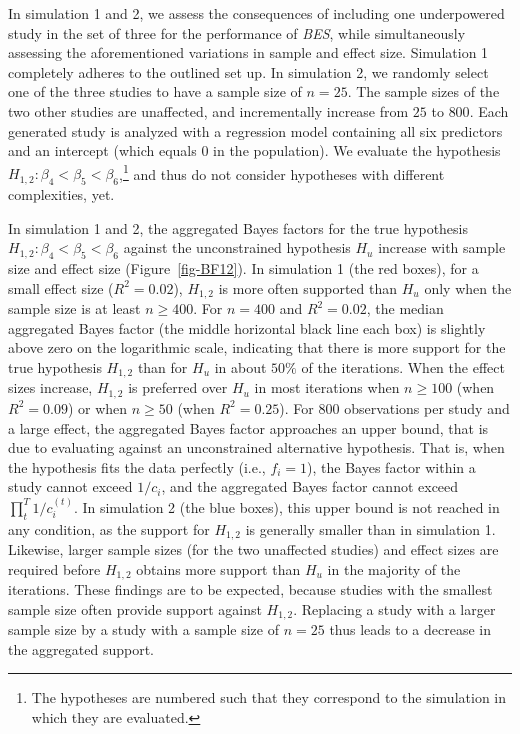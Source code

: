 \documentclass[
]{interact}
\begin{document}
In simulation 1 and 2, we assess the consequences of including one
underpowered study in the set of three for the performance of
\emph{BES}, while simultaneously assessing the aforementioned variations
in sample and effect size. Simulation 1 completely adheres to the
outlined set up. In simulation 2, we randomly select one of the three
studies to have a sample size of \(n = 25\). The sample sizes of the two
other studies are unaffected, and incrementally increase from \(25\) to
\(800\). Each generated study is analyzed with a regression model
containing all six predictors and an intercept (which equals 0 in the
population). We evaluate the hypothesis
\(H_{1,2}: \beta_4 < \beta_5 < \beta_6\),\footnote{ The hypotheses are
  numbered such that they correspond to the simulation in which they are
  evaluated.} and thus do not consider hypotheses with different
complexities, yet.

In simulation 1 and 2, the aggregated Bayes factors for the true
hypothesis \(H_{1,2}: \beta_4 < \beta_5 < \beta_6\) against the
unconstrained hypothesis \(H_u\) increase with sample size and effect
size (Figure~\ref{fig-BF12}). In simulation 1 (the red boxes), for a
small effect size (\(R^2 = 0.02\)), \(H_{1,2}\) is more often supported
than \(H_u\) only when the sample size is at least \(n \geq 400\). For
\(n = 400\) and \(R^2 = 0.02\), the median aggregated Bayes factor (the
middle horizontal black line each box) is slightly above zero on the
logarithmic scale, indicating that there is more support for the true
hypothesis \(H_{1,2}\) than for \(H_u\) in about \(50\%\) of the
iterations. When the effect sizes increase, \(H_{1,2}\) is preferred
over \(H_u\) in most iterations when \(n \geq 100\) (when
\(R^2 = 0.09\)) or when \(n \geq 50\) (when \(R^2 = 0.25\)). For \(800\)
observations per study and a large effect, the aggregated Bayes factor
approaches an upper bound, that is due to evaluating against an
unconstrained alternative hypothesis. That is, when the hypothesis fits
the data perfectly (i.e., \(f_i = 1\)), the Bayes factor within a study
cannot exceed \(1/c_i\), and the aggregated Bayes factor cannot exceed
\(\prod_t^T 1/c_i^{(t)}\). In simulation 2 (the blue boxes), this upper
bound is not reached in any condition, as the support for \(H_{1,2}\) is
generally smaller than in simulation 1. Likewise, larger sample sizes
(for the two unaffected studies) and effect sizes are required before
\(H_{1,2}\) obtains more support than \(H_u\) in the majority of the
iterations. These findings are to be expected, because studies with the
smallest sample size often provide support against \(H_{1,2}\).
Replacing a study with a larger sample size by a study with a sample
size of \(n = 25\) thus leads to a decrease in the aggregated support.
\end{document}
